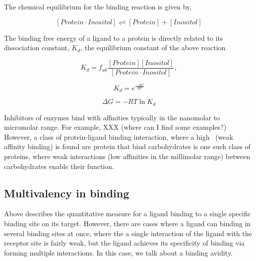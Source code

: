 The chemical equilibrium for the binding reaction is given by,

    \begin{equation}
      \left[ Protein\cdot Inositol \right] 
      \rightleftharpoons 
      \left[ Protein \right]+\left[ Inositol \right]
    \end{equation}
  
    
The binding free energy of a ligand to a protein is directly related to its dissociation constant, $K_d$, the equilibrium constant of the above reaction

    
     \begin{equation}
        K_{d} = f_{ub}\frac{\left[ Protein \right]\left[ Inositol \right]}{\left[Protein \cdot Inositol\right]},
     \end{equation}
     
     \begin{equation}
        K_{d} = e^{\frac{-\Delta G}{RT}}
     \end{equation}

     \begin{equation}
        \Delta G = -RT\ln K_d
     \end{equation}
     

Inhibitors of enzymes bind with affinities typically in the nanomolar to micromolar range.  For example, XXX (where can I find some examples?) However, a class of protein-ligand binding interaction, where a high \KD\ (weak affinity binding) is found are protein that bind carbohydrates is one such class of proteins, where weak interactions (low affinities in the millimolar range) between carbohydrates enable their function.

\subsection{Multivalency in binding}
Above describes the quantitative measure for a ligand binding to a single specific binding site on its target.  However, there are cases where a ligand can binding in several binding sites at once, where the a single interaction of the ligand with the receptor site is fairly weak, but the ligand achieves its specificity of binding via forming multiple interactions.  In this case, we talk about a binding avidity.

